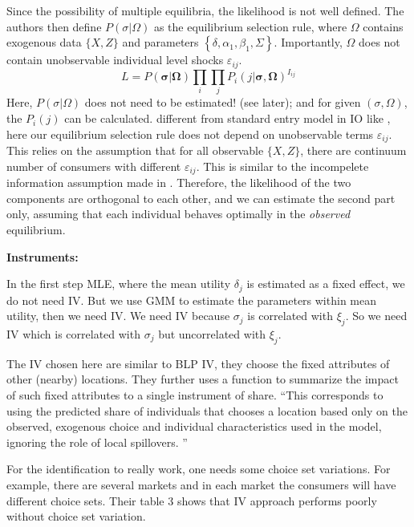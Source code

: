 Since the possibility of multiple equilibria, the likelihood is not well defined. 
The authors then define $P(\sigma | \Omega)$ as the equilibrium selection rule, where $\Omega$ contains exogenous data $\{X,Z\}$ and parameters $\left\{\delta, \alpha_{1}, \beta_{1}, \Sigma\right\}$.
Importantly, $\Omega$ does not contain unobservable individual level shocks $\varepsilon_{ij}$.
\[
    L=P(\boldsymbol{\sigma} | \mathbf{\Omega}) \prod_{i} \prod_{j} P_{i}(j | \boldsymbol{\sigma}, \mathbf{\Omega})^{I_{i j}}
\]
Here, $P(\sigma | \Omega)$ does not need to be estimated! (see later); and for given $(\sigma, \Omega)$, the $P_i(j)$ can be calculated.
 different from standard entry model in IO like \citet{CilibertoTamer2009}, here our equilibrium selection rule does not depend on unobservable terms $\varepsilon_{ij}$.
This relies on the assumption that for all observable $\{X,Z\}$, there are continuum number of consumers with different $\varepsilon_{ij}$.
This is similar to the incompelete information assumption made in \citet{Seim2006}.
Therefore, the likelihood of the two components are orthogonal to each other, and we can estimate the second part only, assuming that each individual behaves optimally in the \textit{observed} equilibrium.

\textbf{Instruments:}


In the first step MLE, where the mean utility $\delta_j$ is estimated as a fixed effect, we do not need IV.
But we use GMM to estimate the parameters within mean utility, then we need IV.
We need IV because $\sigma_j$ is correlated with $\xi_j$. So we need IV which is correlated with $\sigma_j$ but uncorrelated with $\xi_j$.

The IV chosen here are similar to BLP IV, they choose the fixed attributes of other (nearby) locations.
They further uses a function to summarize the impact of such fixed attributes to a single instrument of share.
``This corresponds to using the predicted share of individuals that chooses a location based only on the observed, exogenous choice and individual characteristics used in the model, ignoring the role of local spillovers. ''

For the identification to really work, one needs some choice set variations. 
For example, there are several markets and in each market the consumers will have different choice sets.
Their table 3 shows that IV approach performs poorly without choice set variation.

